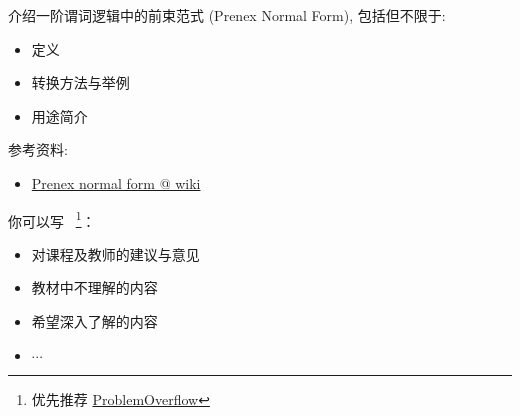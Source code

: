 \documentclass[a4paper, justified]{tufte-handout}
\begin{document}
\begin{solution}
\end{solution}

\begin{ot}[前束范式]
  介绍一阶谓词逻辑中的前束范式 (Prenex Normal Form), 包括但不限于:
  \begin{itemize}
    \item 定义
    \item 转换方法与举例
    \item 用途简介
  \end{itemize}

  参考资料:
  \begin{itemize}
    \item \href{https://en.wikipedia.org/wiki/Prenex\_normal\_form}{Prenex normal form @ wiki}
  \end{itemize}
\end{ot}

\begin{solution}
\end{solution}

\begincorrection

\beginfb

你可以写
~\footnote{优先推荐 \href{problemoverflow.top}{ProblemOverflow}}：
\begin{itemize}
  \item 对课程及教师的建议与意见
  \item 教材中不理解的内容
  \item 希望深入了解的内容
  \item $\cdots$
\end{itemize}
\end{document}
